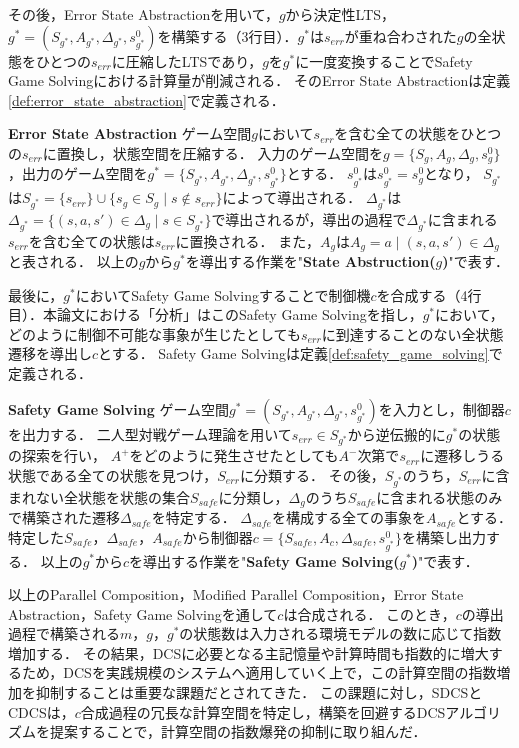 その後，Error State Abstractionを用いて，$g$から決定性LTS，$g^* = (S_{g^*}, A_{g^*}, \Delta_{g^*}, s^0_{g^*})$を構築する（3行目）．$g^*$は$s_{err}$が重ね合わされた$g$の全状態をひとつの$s_{err}$に圧縮したLTSであり，$g$を$g^*$に一度変換することでSafety Game Solvingにおける計算量が削減される．
そのError State Abstractionは定義\ref{def:error_state_abstraction}で定義される．
\begin{dfn}{\textbf{Error State Abstraction}}
\label{def:error_state_abstraction}
    ゲーム空間$g$において$s_{err}$を含む全ての状態をひとつの$s_{err}$に置換し，状態空間を圧縮する．
    入力のゲーム空間を$g = \{S_{g}, A_{g}, \Delta_{g}, s^0_{g}\}$，出力のゲーム空間を$g^* = \{S_{g^*}, A_{g^*}, \Delta_{g^*}, s^0_{g^*}\}$とする．
    $s^0_{g^*}$は$s^0_{g^*} = s^0_{g}$となり，
    $S_{g^*}$は$S_{g^*} = \{s_{err}\} \cup \{ s_{g} \in S_{g} \mid s \notin s_{err} \}$によって導出される．
    $\Delta_{g^*}$は$\Delta_{g^*} = \{ (s,a,s') \in \Delta_{g} \mid s \in S_{g^*} \}$で導出されるが，導出の過程で$\Delta_{g^*}$に含まれる$s_{err}$を含む全ての状態は$s_{err}$に置換される．
    また，$A_{g}$は$A_{g} = { a \mid (s,a,s') \in \Delta_{g}}$と表される．
    以上の$g$から$g^*$を導出する作業を"{\bf State Abstruction($g$)}"で表す．
\end{dfn}

最後に，$g^*$においてSafety Game Solvingすることで制御機$c$を合成する（4行目）．本論文における「分析」はこのSafety Game Solvingを指し，$g^*$において，どのように制御不可能な事象が生じたとしても$s_{err}$に到達することのない全状態遷移を導出し$c$とする．
Safety Game Solvingは定義\ref{def:safety_game_solving}で定義される．

\begin{dfn}{\textbf{Safety Game Solving}}
\label{def:safety_game_solving}
    ゲーム空間$g^* = (S_{g^*}, A_{g^*}, \Delta_{g^*}, s^0_{g^*})$を入力とし，制御器$c$を出力する．
    二人型対戦ゲーム理論を用いて$s_{err} \in S_{g^*}$から逆伝搬的に$g^*$の状態の探索を行い，
    $A^+$をどのように発生させたとしても$A^-$次第で$s_{err}$に遷移しうる状態である全ての状態を見つけ，$S_{err}$に分類する．
    その後，$S_{g^*}$のうち，$S_{err}$に含まれない全状態を状態の集合$S_{safe}$に分類し，$\Delta_{g}$のうち$S_{safe}$に含まれる状態のみで構築された遷移$\Delta_{safe}$を特定する．
    $\Delta_{safe}$を構成する全ての事象を$A_{safe}$とする．
    特定した$S_{safe}$，$\Delta_{safe}$，$A_{safe}$から制御器$c=\{S_{safe}, A_{c}, \Delta_{safe}, s^0_{g^*}\}$を構築し出力する．
    以上の$g^*$から$c$を導出する作業を"{\bf Safety Game Solving($g^*$)}"で表す．
\end{dfn}

以上のParallel Composition，Modified Parallel Composition，Error State Abstraction，Safety Game Solvingを通して$c$は合成される．
このとき，$c$の導出過程で構築される$m$，$g$，$g^*$の状態数は入力される環境モデルの数に応じて指数増加する．
その結果，DCSに必要となる主記憶量や計算時間も指数的に増大するため，DCSを実践規模のシステムへ適用していく上で，この計算空間の指数増加を抑制することは重要な課題だとされてきた\cite{paper:DirectedControllerSyntehsis}\cite{aizawa:IEICEJ2020}\cite{aizawa:SmartWorld}．
この課題に対し，SDCS\cite{yamauchi:IEICEJ2023}とCDCS\cite{yamauchi:IPSJ2024}は，$c$合成過程の冗長な計算空間を特定し，構築を回避するDCSアルゴリズムを提案することで，計算空間の指数爆発の抑制に取り組んだ．

